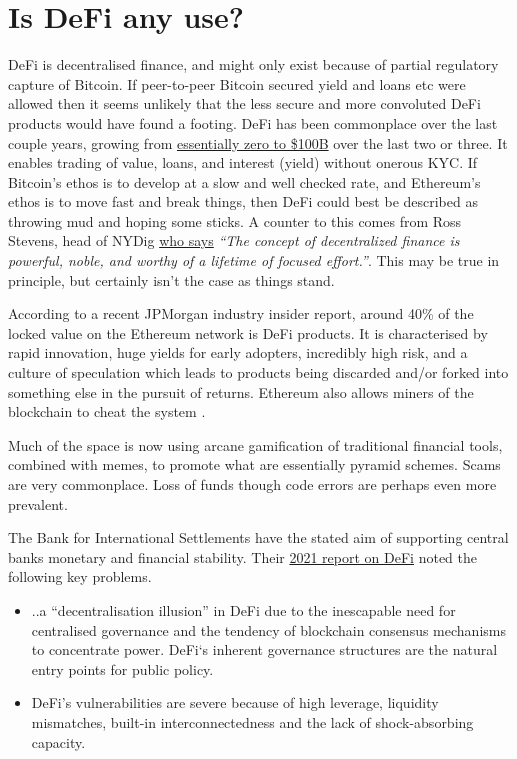 \section{Is DeFi any use?}
DeFi is decentralised finance, and might only exist because of partial regulatory capture of Bitcoin. If peer-to-peer Bitcoin secured yield and loans etc were allowed then it seems unlikely that the less secure and more convoluted DeFi products would have found a footing. DeFi  has been commonplace over the last couple years, growing from \href{https://a16zcrypto.com/state-of-crypto-report-a16z-2022/}{essentially zero to \$100B} over the last two or three. It enables trading of value, loans, and interest (yield) without onerous KYC. If Bitcoin's ethos is to develop at a slow and well checked rate, and Ethereum's ethos is to move fast and break things, then DeFi could best be described as throwing mud and hoping some sticks. A counter to this comes from Ross Stevens, head of NYDig \href{https://nydig.com/on-impossible-things-before-breakfast}{who says} \textit{``The concept of decentralized finance is powerful, noble, and worthy of a lifetime of focused effort.''}. This may be true in principle, but certainly isn't the case as things stand.\par
According to a recent JPMorgan industry insider report, around 40\% of the locked value on the Ethereum network is DeFi products. It is characterised by rapid innovation, huge yields for early adopters, incredibly high risk, and a culture of speculation which leads to products being discarded and/or forked into something else in the pursuit of returns. Ethereum also allows miners of the blockchain to cheat the system \cite{piet2022extracting}.\par 
Much of the space is now using arcane gamification of traditional financial tools, combined with memes, to promote what are essentially pyramid schemes. Scams are very commonplace. Loss of funds though code errors are perhaps even more prevalent.\par
The Bank for International Settlements have the stated aim of supporting central banks monetary and financial stability. Their \href{https://www.bis.org/publ/qtrpdf/r_qt2112b.pdf}{2021 report on DeFi} noted the following key problems.
\begin{itemize}
\item ..a ``decentralisation illusion'' in DeFi due to the inescapable need for centralised governance and the tendency of blockchain consensus mechanisms to concentrate power. DeFi`s inherent governance structures are the natural entry points for public policy.
\item DeFi’s vulnerabilities are severe because of high leverage, liquidity mismatches, built-in interconnectedness and the lack of shock-absorbing capacity.
\end{itemize}
